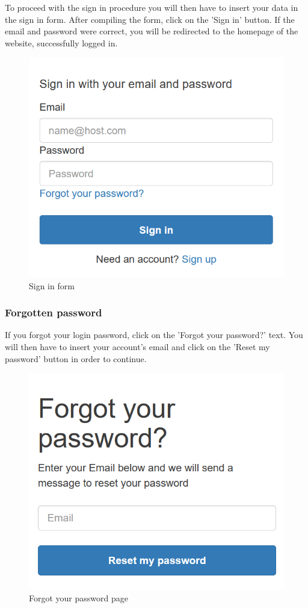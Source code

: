 To proceed with the sign in procedure you will then have to insert your data in the sign in form. After compiling the form, click on the 'Sign in' button. If the email and password were correct, you will be redirected to the homepage of the website, successfully logged in.

\begin{figure}[H]
\centering
\includegraphics[scale=0.6]{res/Immagini/SigninForm}
\caption{Sign in form}
\end{figure}

\subsubsection{Forgotten password}
If you forgot your login password, click on the 'Forgot your password?' text. You will then have to insert your account's email and click on the 'Reset my password' button in order to continue.

\begin{figure}[H]
\centering
\includegraphics[scale=0.6]{res/Immagini/ResetPassword}
\caption{Forgot your password page}
\end{figure}

